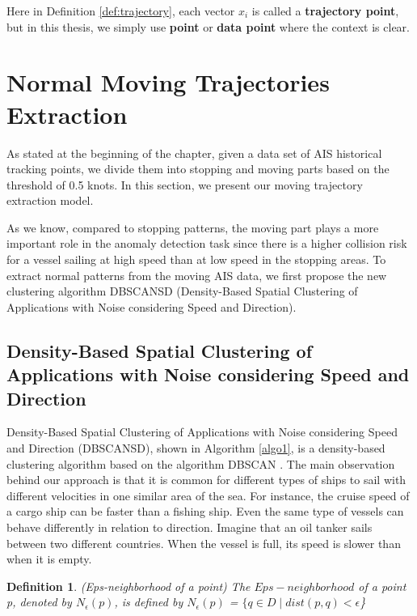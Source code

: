 \documentclass[12pt,glossary]{dalcsthesis}
\newtheorem{definition}{Definition}
\begin{document}
Here in Definition \ref{def:trajectory}, each vector $x_i$ is called a \textbf{trajectory point}, but in this thesis, we simply use \textbf{point} or \textbf{data point} where the context is clear.


\section{Normal Moving Trajectories Extraction}
\label{sec:normal_moving_model}


As stated at the beginning of the chapter, given a data set of AIS historical tracking points, we divide them into stopping and moving parts based on the threshold of 0.5 knots. In this section, we present our moving trajectory extraction model.

As we know, compared to stopping patterns, the moving part plays a more important role in the anomaly detection task since there is a higher collision risk for a vessel sailing at high speed than at low speed in the stopping areas. To extract normal patterns from the moving AIS data, we first propose the new clustering algorithm DBSCANSD (Density-Based Spatial Clustering of Applications with Noise considering Speed and Direction).

\subsection{Density-Based Spatial Clustering of Applications with Noise considering Speed and Direction}


Density-Based Spatial Clustering of Applications with Noise considering Speed and Direction (DBSCANSD), shown in Algorithm \ref{algo1}, is a density-based clustering algorithm based on the algorithm DBSCAN \cite{DBScan96}. The main observation behind our approach is that it is common for different types of ships to sail with different velocities in one similar area of the sea. For instance, the cruise speed of a cargo ship can be faster than a fishing ship. Even the same type of vessels can behave differently in relation to direction. Imagine that an oil tanker sails between two different countries. When the vessel is full, its speed is slower than when it is empty. 

\begin{definition}
\label{def:epsneighborhood_old}
(Eps-neighborhood of a point) The $Eps-neighborhood$ of a point p, denoted by $N_{\epsilon}(p)$, is defined by $N_{\epsilon}(p)$ = $\{ q\in D \mid dist(p, q) < \epsilon$\}
\end{definition}
\end{document}
